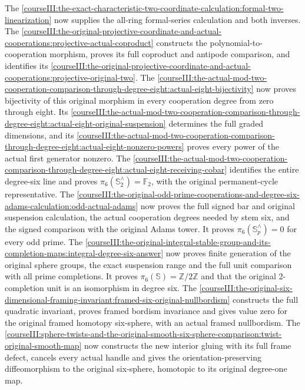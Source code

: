 The \cref{courseIII:the-exact-characteristic-two-coordinate-calculation:formal-two-linearization} now supplies the all-ring formal-series calculation and both inverses. The \cref{courseIII:the-original-projective-coordinate-and-actual-cooperations:projective-actual-coproduct} constructs the polynomial-to-cooperation morphism, proves its full coproduct and antipode comparison, and identifies its \cref{courseIII:the-original-projective-coordinate-and-actual-cooperations:projective-original-two}. The \cref{courseIII:the-actual-mod-two-cooperation-comparison-through-degree-eight:actual-eight-bijectivity} now proves bijectivity of this original morphism in every cooperation degree from zero through eight. Its \cref{courseIII:the-actual-mod-two-cooperation-comparison-through-degree-eight:actual-eight-original-suspension} determines the full graded dimensions, and its \cref{courseIII:the-actual-mod-two-cooperation-comparison-through-degree-eight:actual-eight-nonzero-powers} proves every power of the actual first generator nonzero. The \cref{courseIII:the-actual-mod-two-cooperation-comparison-through-degree-eight:actual-eight-receiving-cobar} identifies the entire degree-six line and proves \(\pi_6(\mathbb S^{\wedge}_2)=\mathbb F_2\), with the original permanent-cycle representative. The \cref{courseIII:the-original-odd-prime-cooperations-and-degree-six-adams-calculation:odd-actual-adams} now proves the full signed bar and original suspension calculation, the actual cooperation degrees needed by stem six, and the signed comparison with the original Adams tower. It proves \(\pi_6(\mathbb S^{\wedge}_p)=0\) for every odd prime. The \cref{courseIII:the-original-integral-stable-group-and-its-completion-maps:integral-degree-six-answer} now proves finite generation of the original sphere groups, the exact suspension range and the full unit comparison with all prime completions. It proves \(\pi_6(\mathbb S)=\mathbb Z/2\mathbb Z\) and that the original 2-completion unit is an isomorphism in degree six. The \cref{courseIII:the-original-six-dimensional-framing-invariant:framed-six-original-nullbordism} constructs the full quadratic invariant, proves framed bordism invariance and gives value zero for the original framed homotopy six-sphere, with an actual framed nullbordism. The \cref{courseIII:sphere-twists-and-the-original-smooth-six-sphere-comparison:twist-original-smooth-map} now constructs the new interior gluing with its full frame defect, cancels every actual handle and gives the orientation-preserving diffeomorphism to the original six-sphere, homotopic to its original degree-one map.

